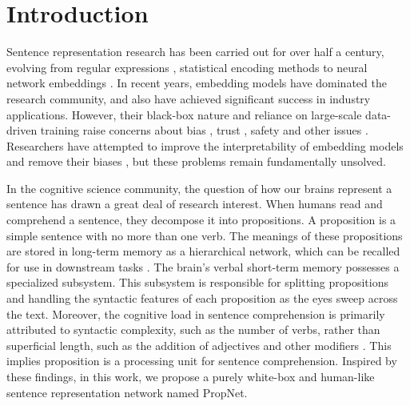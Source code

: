 \section{Introduction}


Sentence representation research has been carried out for over half a century, evolving from regular expressions \cite{1985Generalized}, statistical encoding methods \cite{harris54, Katz:87, 1968Automatic, jones72astatistical} to neural network embeddings \cite{mikolov2013efficient, bojanowski2016enriching, joulin2016bagtricksefficienttext, joulin2016fasttextzip, devlin2018bert, Reimers2019SentenceBERTSE, Gao2021SimCSESC, Li2024AoEAE}. In recent years, embedding models have dominated the research community, and also have achieved significant success in industry applications. However, their black-box nature and reliance on large-scale data-driven training raise concerns about bias \citep{conf/nips/BolukbasiCZSK16, Caliskan_2017, Brunet2018Understanding, Nadeem2021StereoSet}, trust \citep{Ribeiro2016why, conf/acl/RibeiroWGS20}, safety \citep{conf/naacl/BelinkovG19, conf/emnlp/PerezHSCRAGMI22} and other issues \citep{Bender2021On}. Researchers have attempted to improve the interpretability of embedding models \citep{conf/emnlp/JainBMMW18, conf/ijcnlp/LiaoLHL20} and remove their biases \citep{conf/naacl/GonenG19, conf/ltedi/GiraZL22}, but these problems remain fundamentally unsolved.  


In the cognitive science community, the question of how our brains represent a sentence has drawn a great deal of research interest. When humans read and comprehend a sentence, they decompose it into propositions. A proposition is a simple sentence with no more than one verb. The meanings of these propositions are stored in long-term memory as a hierarchical network, which can be recalled for use in downstream tasks \citep{Kintsch1978TowardAM, Collins1969RetrievalTF}. The brain's verbal short-term memory possesses a specialized subsystem. This subsystem is responsible for splitting propositions and handling the syntactic features of each proposition as the eyes sweep across the text\citep{1999Verbal}. Moreover, the cognitive load in sentence comprehension is primarily attributed to syntactic complexity, such as the number of verbs, rather than superficial length, such as the addition of adjectives and other modifiers \citep{1998Linguistic}. This implies proposition is a processing unit for sentence comprehension. Inspired by these findings, in this work, we propose a purely white-box and human-like sentence representation network named PropNet. 

